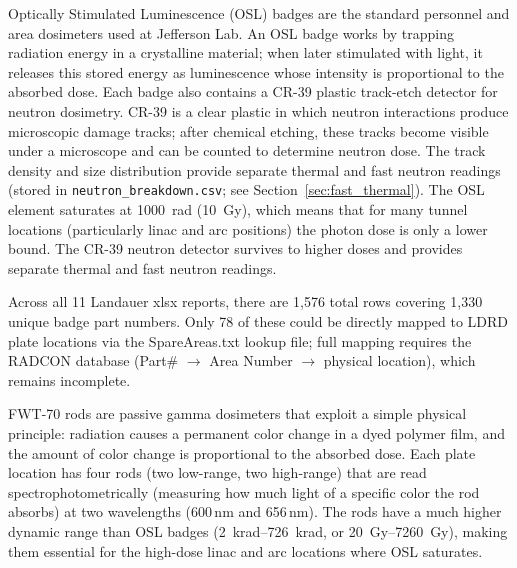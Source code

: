 \documentclass[11pt,letterpaper]{article}
\newcommand{\JLab}{Jefferson Lab}
\begin{document}
\begin{description}[style=nextline]
    \item[OSL Badges (Landauer InLight 2T + CR-39)]
    Optically Stimulated Luminescence (OSL) badges are the standard personnel
    and area dosimeters used at \JLab. An OSL badge works by trapping radiation
    energy in a crystalline material; when later stimulated with light, it
    releases this stored energy as luminescence whose intensity is proportional
    to the absorbed dose. Each badge also contains a CR-39 plastic track-etch
    detector for neutron dosimetry. CR-39 is a clear plastic in which neutron
    interactions produce microscopic damage tracks; after chemical etching, these
    tracks become visible under a microscope and can be counted to determine
    neutron dose. The track density and size distribution provide separate
    thermal and fast neutron readings (stored in
    \texttt{neutron\_breakdown.csv}; see Section~\ref{sec:fast_thermal}).
    The OSL element saturates at \SI{1000}{rad} (\SI{10}{Gy}),
    which means that for many tunnel locations (particularly linac and arc
    positions) the photon dose is only a lower bound. The CR-39
    neutron detector survives to higher doses and provides separate thermal
    and fast neutron readings.

    Across all 11 Landauer xlsx reports, there are 1,576 total rows covering
    1,330 unique badge part numbers. Only 78 of these could be directly mapped
    to LDRD plate locations via the SpareAreas.txt lookup file; full mapping
    requires the RADCON database (Part\# $\to$ Area Number $\to$ physical
    location), which remains incomplete.

    \item[FWT-70 Optichromic Rods (AIdata)]
    FWT-70 rods are passive gamma dosimeters that exploit a simple physical
    principle: radiation causes a permanent color change in a dyed polymer film,
    and the amount of color change is proportional to the absorbed dose. Each
    plate location has four rods (two low-range, two high-range) that are read
    spectrophotometrically (measuring how much light of a specific color the rod
    absorbs) at two wavelengths (600\,nm and 656\,nm). The rods have a much higher dynamic
    range than OSL badges (\SIrange{2}{726}{krad}, or \SIrange{20}{7260}{Gy}),
    making them essential for the high-dose linac and arc locations where OSL
    saturates.


\end{description}
\end{document}
